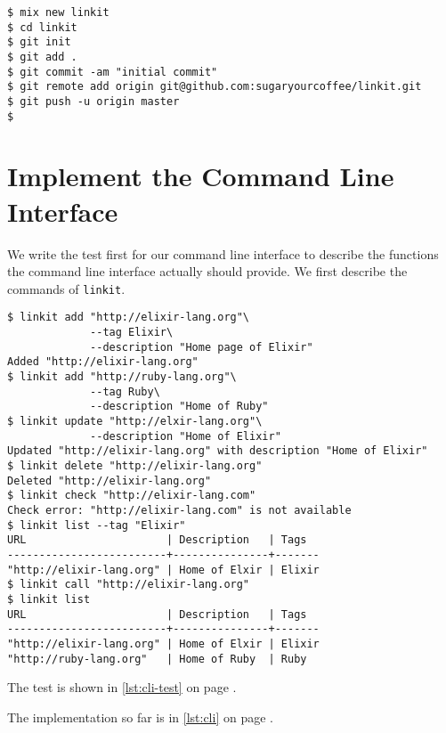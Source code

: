 \documentclass[10pt, a4paper]{article}
\newcommand{\includecode}[3]{}
\begin{document}
\begin{verbatim}
$ mix new linkit
$ cd linkit
$ git init
$ git add .
$ git commit -am "initial commit"
$ git remote add origin git@github.com:sugaryourcoffee/linkit.git
$ git push -u origin master
$
\end{verbatim}

\section{Implement the Command Line Interface}
We write the test first for our command line interface to describe the
functions the command line interface actually should provide. We first 
describe the commands of \texttt{linkit}.

\begin{verbatim}
$ linkit add "http://elixir-lang.org"\
             --tag Elixir\
             --description "Home page of Elixir"
Added "http://elixir-lang.org"
$ linkit add "http://ruby-lang.org"\
             --tag Ruby\
             --description "Home of Ruby"
$ linkit update "http://elxir-lang.org"\
             --description "Home of Elixir"
Updated "http://elixir-lang.org" with description "Home of Elixir"
$ linkit delete "http://elixir-lang.org"
Deleted "http://elixir-lang.org"
$ linkit check "http://elixir-lang.com"
Check error: "http://elixir-lang.com" is not available
$ linkit list --tag "Elixir"
URL                      | Description   | Tags
-------------------------+---------------+-------
"http://elixir-lang.org" | Home of Elxir | Elixir
$ linkit call "http://elixir-lang.org"
$ linkit list
URL                      | Description   | Tags
-------------------------+---------------+-------
"http://elixir-lang.org" | Home of Elxir | Elixir
"http://ruby-lang.org"   | Home of Ruby  | Ruby   
\end{verbatim}

The test is shown in \ref{lst:cli-test} on page \pageref{lst:cli-test}.

\includecode{test/cli\_test.exs}{lst:cli-test}{files/cli_test.exs}

The implementation so far is in \ref{lst:cli} on page \pageref{lst:cli}.

\includecode{lib/linkit/cli.ex}{lst:cli}{files/cli.ex}
\end{document}
